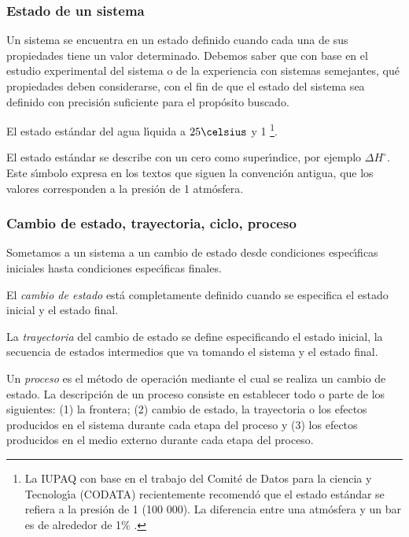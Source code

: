 \subsubsection{Estado de un sistema}
Un sistema se encuentra en un estado definido cuando cada una de sus propiedades tiene un valor determinado. Debemos saber que con base en el estudio experimental del sistema o de la experiencia con sistemas semejantes, qu\'e propiedades deben considerarse, con el fin de que el estado del sistema sea definido con precisi\'on suficiente para el prop\'osito buscado.

\begin{example}El estado est\'andar del agua l\'{\i}quida a $25\celsius$ y 1 \bbar \footnote{ La IUPAQ con base en el trabajo del Comit\'e de Datos para la ciencia y Tecnolog\'{\i}a (CODATA) recientemente recomend\'o que el estado est\'andar se refiera a la presi\'on de 1 \bbar (100 000\pascal). La diferencia entre una atm\'osfera y un bar es de alrededor de 1\% .}.
\end{example}

 El estado est\'andar se describe con un cero como super\'{\i}ndice, por ejemplo $\Delta H^\circ$. Este s\'{\i}mbolo expresa en los textos que siguen la convenci\'on antigua, que los valores corresponden a  la presi\'on de 1 atm\'osfera.

\subsubsection{Cambio de estado, trayectoria, ciclo, proceso}

Sometamos a un sistema a un cambio de estado  desde
condiciones espec\'{\i}ficas iniciales hasta condiciones espec\'{\i}ficas finales.

El \textit{cambio de estado} est\'a completamente  definido cuando se especifica el estado inicial y el estado final.

La \textit{trayectoria}  del cambio de estado se define especificando el estado inicial, la secuencia de estados intermedios que va tomando el sistema y el estado final.

Un \textit{proceso}  es el m\'etodo de operaci\'on mediante el cual se realiza un cambio de estado. La descripci\'on de un proceso consiste en establecer todo o parte de los siguientes: (1) la frontera; (2) cambio de estado, la trayectoria o los efectos producidos en el sistema durante cada etapa del proceso y (3) los efectos producidos en el medio externo durante cada etapa del proceso.


